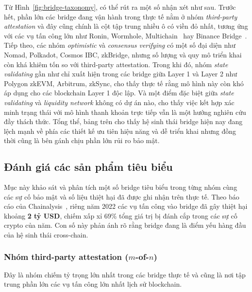 Từ Hình~\ref{fig:bridge-taxonomy}, có thể rút ra một số nhận xét như sau.
Trước hết, phần lớn các bridge đang vận hành trong thực tế nằm ở nhóm 
\textit{third-party attestation} và đây cũng chính là cột tập trung nhiều ô có viền đỏ nhất, 
tương ứng với các vụ tấn công lớn như Ronin, Wormhole, Multichain~\cite{multichain_chainalysis} hay Binance Bridge~\cite{bnb_bridge_halborn}. 
Tiếp theo, các nhóm \textit{optimistic} và \textit{consensus verifying} có một số đại 
diện như Nomad, Polkadot, Cosmos IBC, zkBridge, nhưng số lượng và quy mô triển khai còn khá 
khiêm tốn so với third-party attestation. 
Trong khi đó, nhóm \textit{state validating} gần như chỉ xuất hiện trong các bridge giữa
Layer 1 và Layer 2 như Polygon zkEVM, Arbitrum, zkSync, cho thấy thực tế rằng mô hình này còn khó 
áp dụng cho các blockchain Layer 1 độc lập. 
Và một điểm đặc biệt giữa \textit{state validating} và \textit{liquidity network} không có dự án nào,
cho thấy việc kết hợp xác minh trạng thái với mô hình thanh khoản trực tiếp vẫn là một hướng nghiên cứu đầy thách thức. 
Tổng thể, bảng trên cho thấy hệ sinh thái bridge hiện nay đang lệch mạnh về 
phía các thiết kế ưu tiên hiệu năng và dễ triển khai nhưng đồng thời cũng là bên gánh chịu 
phần lớn rủi ro bảo mật.

\subsection{Đánh giá các sản phẩm tiêu biểu}
\label{sec:related-products}

Mục này khảo sát và phân tích một số bridge tiêu biểu trong từng nhóm cùng các sự 
cố bảo mật và số liệu thiệt hại đã được ghi nhận trên thực tế. 
Theo báo cáo của Chainalysis~\cite{chainalysis2022bridge},
riêng năm 2022 các vụ tấn công vào bridge đã gây thiệt hại khoảng
\textbf{2 tỷ USD}, chiếm xấp xỉ 69\% tổng giá trị bị đánh cắp trong các sự cố crypto của năm.
Con số này phản ánh rõ rằng bridge đang là điểm yếu hàng đầu của hệ sinh thái cross-chain.

\subsubsection*{Nhóm third-party attestation ($m$-of-$n$)}

Đây là nhóm chiếm tỷ trọng lớn nhất trong các bridge thực tế và cũng là nơi 
tập trung phần lớn các vụ tấn công lớn nhất lịch sử blockchain.

